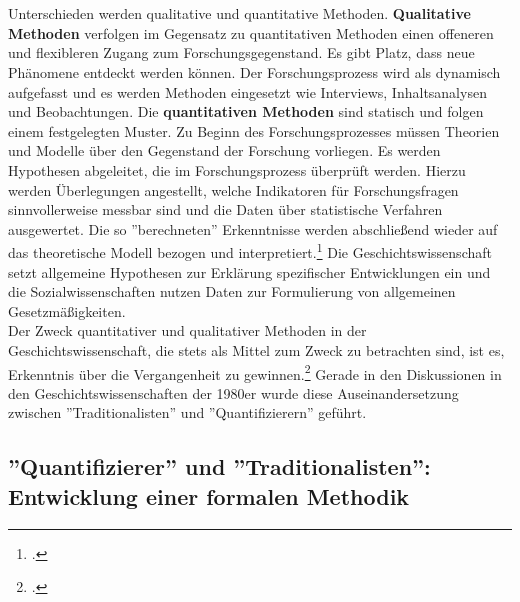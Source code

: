 \documentclass[12pt,a4paper]{article}
\begin{document}
\\
\\
Unterschieden werden qualitative und quantitative Methoden. \textbf{Qualitative Methoden} verfolgen im Gegensatz zu quantitativen Methoden einen offeneren und flexibleren Zugang zum Forschungsgegenstand. Es gibt Platz, dass neue Phänomene entdeckt werden können. Der Forschungsprozess wird als dynamisch aufgefasst und es werden Methoden eingesetzt wie Interviews, Inhaltsanalysen und Beobachtungen. Die \textbf{quantitativen Methoden} sind statisch und folgen einem festgelegten Muster. Zu Beginn des Forschungsprozesses müssen Theorien und Modelle über den Gegenstand der Forschung vorliegen. Es werden Hypothesen abgeleitet, die im Forschungsprozess überprüft werden. Hierzu werden Überlegungen angestellt, welche Indikatoren für Forschungsfragen sinnvollerweise messbar sind und die Daten über statistische Verfahren ausgewertet. Die so ''berechneten'' Erkenntnisse werden abschließend wieder auf das theoretische Modell bezogen und interpretiert.\footcite[][S.309–329]{wolf1995qualitative} Die Geschichtswissenschaft setzt allgemeine Hypothesen zur Erklärung spezifischer Entwicklungen ein und die Sozialwissenschaften nutzen Daten zur Formulierung von allgemeinen Gesetzmäßigkeiten.
\\
Der Zweck quantitativer und qualitativer Methoden in der Geschichtswissenschaft, die stets als Mittel zum Zweck zu betrachten sind, ist es, Erkenntnis über die Vergangenheit zu gewinnen.\footcite[][S.203-206]{jarausch1985quantitative} Gerade in den Diskussionen in den Geschichtswissenschaften der 1980er wurde diese Auseinandersetzung zwischen ''Traditionalisten'' und ''Quantifizierern'' geführt.

\newpage
\subsection{''Quantifizierer'' und ''Traditionalisten'': Entwicklung einer formalen Methodik }
\end{document}
